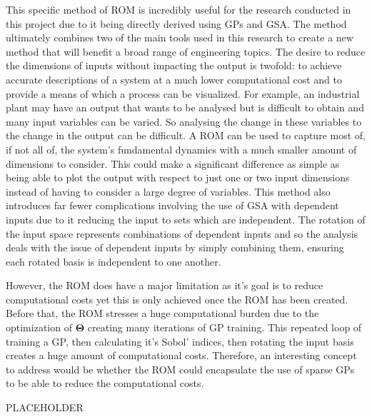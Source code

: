 \documentclass[preprint,12pt]{elsarticle}
\newcommand*{\M}[1]{\ensuremath{#1}\xspace}
\newcommand*{\vr}[1]{\M{\mathbf{#1}}}
\begin{document}
	This specific method of ROM is incredibly useful for the research conducted in this project due to it being directly derived using GPs and GSA. The method ultimately combines two of the main tools used in this research to create a new method that will benefit a broad range of engineering topics. The desire to reduce the dimensions of inputs without impacting the output is twofold: to achieve accurate descriptions of a system at a much lower computational cost and to provide a means of which a process can be visualized. For example, an industrial plant may have an output that wants to be analysed but is difficult to obtain and many input variables can be varied. So analysing the change in these variables to the change in the output can be difficult. A ROM can be used to capture most of, if not all of, the system's fundamental dynamics with a much smaller amount of dimensions to consider. This could make a significant difference as simple as being able to plot the output with respect to just one or two input dimensions instead of having to consider a large degree of variables. This method also introduces far fewer complications involving the use of GSA with dependent inputs due to it reducing the input to sets which are independent. The rotation of the input space represents combinations of dependent inputs and so the analysis deals with the issue of dependent inputs by simply combining them, ensuring each rotated basis is independent to one another.
	
	However, the ROM does have a major limitation as it's goal is to reduce computational costs yet this is only achieved once the ROM has been created. Before that, the ROM stresses a huge computational burden due to the optimization of $\vr{\Theta}$ creating many iterations of GP training. This repeated loop of training a GP, then calculating it's Sobol' indices, then rotating the input basis creates a huge amount of computational costs. Therefore, an interesting concept to address would be whether the ROM could encapsulate the use of sparse GPs to be able to reduce the computational costs.

PLACEHOLDER
\end{document}
